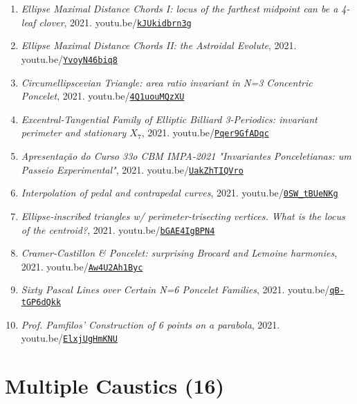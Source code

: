 \documentclass[12pt]{article}
\begin{document}
\begin{enumerate}[resume]
\item \textit{Ellipse Maximal Distance Chords I: locus of the farthest midpoint can be a 4-leaf clover}, 2021. youtu.be/\href{https://youtu.be/kJUkidbrn3g}{\nolinkurl{kJUkidbrn3g}}
\item \textit{Ellipse Maximal Distance Chords II: the Astroidal Evolute}, 2021. youtu.be/\href{https://youtu.be/YvoyN46biq8}{\nolinkurl{YvoyN46biq8}}
\item \textit{Circumellipscevian Triangle: area ratio invariant in N=3 Concentric Poncelet}, 2021. youtu.be/\href{https://youtu.be/4Q1uouMQzXU}{\nolinkurl{4Q1uouMQzXU}}
\item \textit{Excentral-Tangential Family of Elliptic Billiard 3-Periodics: invariant perimeter and stationary $X_{7}$}, 2021. youtu.be/\href{https://youtu.be/Pqer9GfADqc}{\nolinkurl{Pqer9GfADqc}}
\item \textit{Apresentação do Curso 33o CBM IMPA-2021
"Invariantes Ponceletianas: um Passeio Experimental"}, 2021. youtu.be/\href{https://youtu.be/UakZhTIQVro}{\nolinkurl{UakZhTIQVro}}
\item \textit{Interpolation of pedal and contrapedal curves}, 2021. youtu.be/\href{https://youtu.be/0SW_tBUeNKg}{\nolinkurl{0SW\_tBUeNKg}}
\item \textit{Ellipse-inscribed triangles w/ perimeter-trisecting vertices. What is the locus of the centroid?}, 2021. youtu.be/\href{https://youtu.be/bGAE4IgBPN4}{\nolinkurl{bGAE4IgBPN4}}
\item \textit{Cramer-Castillon \& Poncelet: surprising Brocard and Lemoine harmonies}, 2021. youtu.be/\href{https://youtu.be/Aw4U2Ah1Byc}{\nolinkurl{Aw4U2Ah1Byc}}
\item \textit{Sixty Pascal Lines over Certain N=6 Poncelet Families}, 2021. youtu.be/\href{https://youtu.be/qB-tGP6dQkk}{\nolinkurl{qB-tGP6dQkk}}
\item \textit{Prof. Pamfilos' Construction of 6 points on a parabola}, 2021. youtu.be/\href{https://youtu.be/ElxjUgHmKNU}{\nolinkurl{ElxjUgHmKNU}}
\end{enumerate}

\section{Multiple Caustics (16)}
\end{document}
